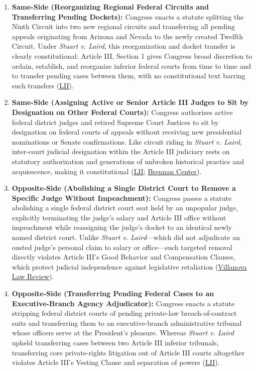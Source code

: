 \documentclass[12pt]{article}
\begin{document}
\begin{enumerate}
\item \textbf{Same-Side (Reorganizing Regional Federal Circuits and Transferring Pending Dockets):} Congress enacts a statute splitting the Ninth Circuit into two new regional circuits and transferring all pending appeals originating from Arizona and Nevada to the newly created Twelfth Circuit. Under \textit{Stuart v. Laird}, this reorganization and docket transfer is clearly constitutional: Article III, Section 1 gives Congress broad discretion to ordain, establish, and reorganize inferior federal courts from time to time and to transfer pending cases between them, with no constitutional text barring such transfers (\href{https://www.law.cornell.edu/supremecourt/text/5/299}{LII}).

\item \textbf{Same-Side (Assigning Active or Senior Article III Judges to Sit by Designation on Other Federal Courts):} Congress authorizes active federal district judges and retired Supreme Court Justices to sit by designation on federal courts of appeals without receiving new presidential nominations or Senate confirmations. Like circuit riding in \textit{Stuart v. Laird}, inter-court judicial designation within the Article III judiciary rests on statutory authorization and generations of unbroken historical practice and acquiescence, making it constitutional (\href{https://www.law.cornell.edu/supremecourt/text/5/299}{LII}; \href{https://www.brennancenter.org/media/15940/download/bcj_constitutionality-of-supreme-court-term-limits.pdf?inline=1}{Brennan Center}).

\item \textbf{Opposite-Side (Abolishing a Single District Court to Remove a Specific Judge Without Impeachment):} Congress passes a statute abolishing a single federal district court seat held by an unpopular judge, explicitly terminating the judge's salary and Article III office without impeachment while reassigning the judge's docket to an identical newly named district court. Unlike \textit{Stuart v. Laird}---which did not adjudicate an ousted judge's personal claim to salary or office---such targeted removal directly violates Article III's Good Behavior and Compensation Clauses, which protect judicial independence against legislative retaliation (\href{https://digitalcommons.law.villanova.edu/cgi/viewcontent.cgi?article=3118&context=vlr}{Villanova Law Review}).

\item \textbf{Opposite-Side (Transferring Pending Federal Cases to an Executive-Branch Agency Adjudicator):} Congress enacts a statute stripping federal district courts of pending private-law breach-of-contract suits and transferring them to an executive-branch administrative tribunal whose officers serve at the President's pleasure. Whereas \textit{Stuart v. Laird} upheld transferring cases between two Article III inferior tribunals, transferring core private-rights litigation out of Article III courts altogether violates Article III's Vesting Clause and separation of powers (\href{https://www.law.cornell.edu/supremecourt/text/5/299}{LII}).


\end{enumerate}
\end{document}
